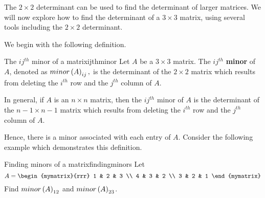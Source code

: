 The $2 \times 2$ determinant can be used to find the determinant of larger matrices.
We will now explore how to find the determinant of a $3 \times 3$ matrix, using several tools
including the $2 \times 2$ determinant.

We begin with the following definition. 

\begin{definition}{The $ij^{th}$ minor of a matrix}{ijthminor}
Let $A$ be a $3\times 3$ matrix. The $ij^{th}$ \textbf{minor} of $A$, denoted as $minor\left(A\right) _{ij},$ is the determinant
of the $2\times 2$ matrix which results from deleting the $i^{th}$ row and
the $j^{th}$ column of $A$.

In general, if $A$ is an $n\times n$ matrix, then the $ij^{th}$ minor of $A$ is the determinant of the $n-1 \times n-1$ matrix which results from deleting the $i^{th}$ row and the $j^{th}$ column of $A$. 
\end{definition}

Hence, there is a minor associated with each entry of $A$. Consider the following example which demonstrates this definition. 

\begin{example}{Finding minors of a matrix}{findingminors}
Let 
\begin{equation*}
A = \begin{mymatrix}{rrr}
1 & 2 & 3 \\
4 & 3 & 2 \\
3 & 2 & 1
\end{mymatrix} 
\end{equation*}
Find $minor\left(A\right) _{12}$ and $minor\left(A\right) _{23}$.
\end{example}

